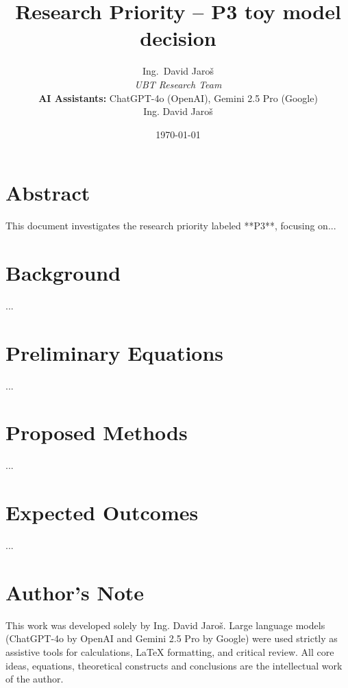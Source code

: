 \documentclass[12pt]{article}
\title{Research Priority – P3 toy model decision}
\author{
Ing.~David Jaroš \\
\textit{UBT Research Team} \\
\textbf{AI Assistants:} ChatGPT-4o (OpenAI), Gemini 2.5 Pro (Google) \\
Ing. David Jaroš}
\date{\today}
\begin{document}
\maketitle

\section*{Abstract}
This document investigates the research priority labeled **P3**, focusing on...

\section*{Background}
...

\section*{Preliminary Equations}
...

\section*{Proposed Methods}
...

\section*{Expected Outcomes}
...


\section*{Author's Note}

This work was developed solely by Ing. David Jaroš.  
Large language models (ChatGPT-4o by OpenAI and Gemini 2.5 Pro by Google) were used strictly as assistive tools for calculations, LaTeX formatting, and critical review.  
All core ideas, equations, theoretical constructs and conclusions are the intellectual work of the author.
\end{document}
